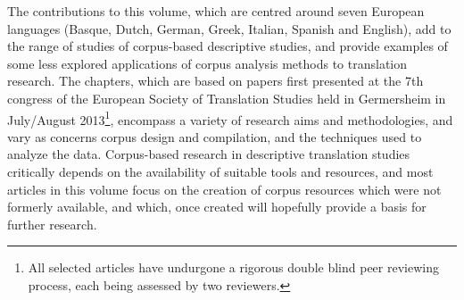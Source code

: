 \begin{refsection}
The contributions to this volume, which are centred around seven European languages (Basque, Dutch, German, Greek, Italian, Spanish and English), add to the range of studies of corpus-based descriptive studies, and provide examples of some less explored applications of corpus analysis methods to translation research. The chapters, which are based on papers first presented at the 7th congress of the European Society of Translation Studies held in Germersheim in July/August 2013\footnote{All selected articles have undurgone a rigorous double blind peer reviewing process, each being assessed by two reviewers.},  encompass a variety of research aims and methodologies, and vary as concerns corpus design and compilation, and the techniques used to analyze the data. Corpus-based research in descriptive translation studies critically depends on the availability of suitable tools and resources, and most articles in this volume focus on the creation of corpus resources which were not formerly available, and which, once created will hopefully provide a basis for further research.
 

\end{refsection}

